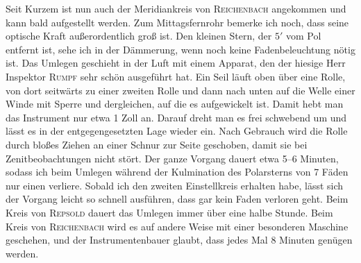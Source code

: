 \par\indent Seit Kurzem ist nun auch der Meridiankreis von \textsc{Reichenbach} angekommen und kann bald aufgestellt werden. Zum Mittagsfernrohr bemerke ich noch, dass seine optische Kraft außerordentlich groß ist. Den kleinen Stern, der $5'$ vom Pol entfernt ist, sehe ich in der Dämmerung, wenn noch keine Fadenbeleuchtung nötig ist. Das Umlegen geschieht in der Luft mit einem Apparat, den der hiesige Herr Inspektor \textsc{Rumpf} sehr schön ausgeführt hat. Ein Seil läuft oben über eine Rolle, von dort seitwärts zu einer zweiten Rolle und dann nach unten auf die Welle einer Winde mit Sperre und dergleichen, auf die es aufgewickelt ist. Damit hebt man das Instrument nur etwa 1 Zoll an. Darauf dreht man es frei schwebend um und lässt es in der entgegengesetzten Lage wieder ein. Nach Gebrauch wird die Rolle durch bloßes Ziehen an einer Schnur zur Seite geschoben, damit sie bei Zenitbeobachtungen nicht stört. Der ganze Vorgang dauert etwa 5--6 Minuten, sodass ich beim Umlegen während der Kulmination des Polarsterns von 7 Fäden nur einen verliere. Sobald ich den zweiten Einstellkreis erhalten habe, lässt sich der Vorgang leicht so schnell ausführen, dass gar kein Faden verloren geht. Beim Kreis von \textsc{Repsold} dauert das Umlegen immer über eine halbe Stunde. Beim Kreis von \textsc{Reichenbach} wird es auf andere Weise mit einer besonderen Maschine geschehen, und der Instrumentenbauer glaubt, dass jedes Mal 8 Minuten genügen werden.
